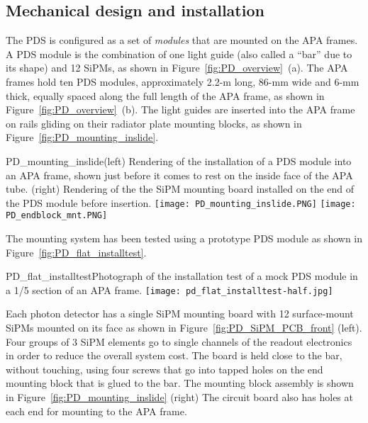 \subsection{Mechanical design and installation}

The PDS is configured as a set of \textit{modules} that are mounted on the APA frames.  A PDS module is
the combination of one light guide (also called a ``bar'' due to its
shape) and 12 SiPMs, as shown in Figure~\ref{fig:PD_overview}~(a). 
The APA frames hold ten PDS modules, approximately 2.2-m long,
86-mm wide and 6-mm thick, equally spaced along the full length of the
APA frame, as shown in Figure~\ref{fig:PD_overview}~(b). 
The light guides are inserted into the APA frame on rails gliding on their radiator
plate mounting blocks, as shown in Figure~\ref{fig:PD_mounting_inslide}. 

\begin{cdrfigure}
  {PD_mounting_inslide}{(left) Rendering of the installation of a PDS module
    into an APA frame, shown just before it comes to rest on the inside face
    of the APA tube. (right) Rendering of the the SiPM mounting board
    installed on the end of the PDS module before insertion.}
\texttt{[image: PD\_mounting\_inslide.PNG]}
\texttt{[image: PD\_endblock\_mnt.PNG]}
\end{cdrfigure}

The mounting system has been tested using a prototype PDS module  
as shown in Figure~\ref{fig:PD_flat_installtest}.
\begin{cdrfigure}
  {PD_flat_installtest}{Photograph of the installation
    test of a mock PDS module in a 1/5 section of an APA frame.}
\texttt{[image: pd\_flat\_installtest-half.jpg]}
\end{cdrfigure}


Each photon detector has a single SiPM mounting board with 12 surface-mount SiPMs 
mounted on its face as shown in Figure~\ref{fig:PD_SiPM_PCB_front} (left).
Four groups of $3$ SiPM elements go to single 
channels of the readout electronics in order to reduce the overall system cost.
The board is held close to the bar, without touching, using four screws that go into 
tapped holes on the end mounting block that is glued to the bar.  
The mounting block assembly is shown in Figure~\ref{fig:PD_mounting_inslide} (right) %
The circuit board also has holes at each end for mounting to the APA frame.  

